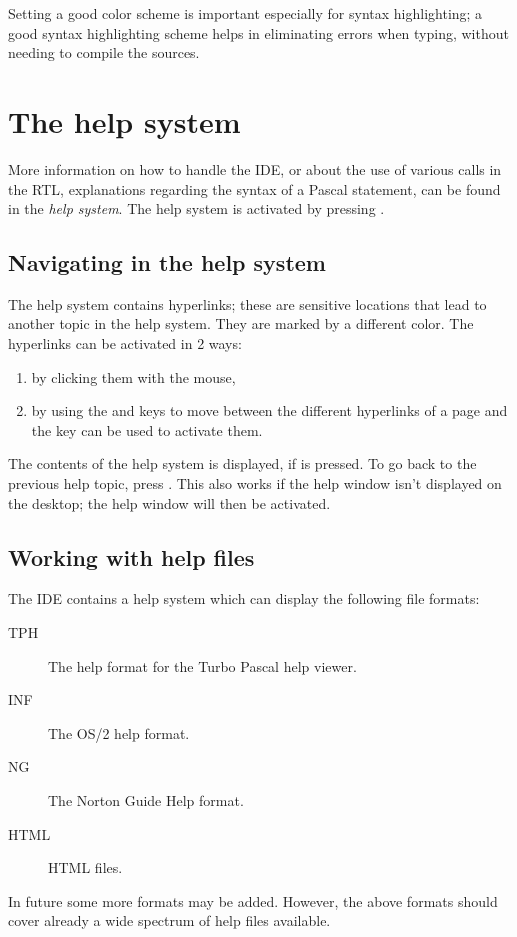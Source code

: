Setting a good color scheme is important especially for syntax highlighting;
a good syntax highlighting scheme helps in eliminating errors when typing,
without needing to compile the sources. 

\section{The help system}

More information on how to handle the IDE, or about the use of various
calls in the RTL, explanations regarding the syntax of a Pascal statement,
can be found in the \emph{help system}. The help system is activated
by pressing .

\subsection{Navigating in the help system}
The help system contains hyperlinks; these are sensitive locations that
lead to another topic in the help system. They are marked by a different
color. The hyperlinks can be activated in 2 ways:
\begin{enumerate}
\item by clicking them with the mouse,
\item by using the  and  keys to move between 
the different hyperlinks of a page and the  key can be used 
to activate them.
\end{enumerate}

The contents of the help system is displayed, if  is
pressed. To go back to the previous help topic, press . 
This also works if the help window isn't displayed on the desktop; the help
window will then be activated.

%
%
\subsection{Working with help files}
The IDE contains a help system which can display the following file formats:
\begin{description}
\item[TPH] The help format for the Turbo Pascal help viewer.
\item[INF] The OS/2 help format.
\item[NG] The Norton Guide Help format.
\item[HTML] HTML files. 
\end{description}
In future some more formats may be added. However, the above formats should 
cover already a wide spectrum of help files available.

